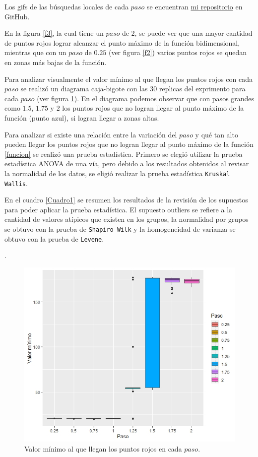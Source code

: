 \documentclass{article}
\begin{document}
Los gifs \citep{4} de las búsquedas locales de cada $paso$ se encuentran \href{https://github.com/nataliaperez0/Simulation/tree/main/Tarea7}{mi repositorio} en GitHub.
\bigskip

En la figura \ref{f3}, la cual tiene un $paso$ de $2$, se puede ver que una mayor cantidad de puntos rojos lograr alcanzar el punto máximo de la función bidimensional, mientras que con un $paso$ de $0.25$ (ver figura \ref{f2}) varios puntos rojos se quedan en zonas más bajas de la función.
\bigskip

Para analizar visualmente el valor mínimo al que llegan los puntos rojos con cada $paso$ se realizó un diagrama caja-bigote con las $30$ replicas del exprimento para cada $paso$ (ver figura \ref{f4}). En el diagrama podemos observar que con pasos grandes como $1.5$, $1.75$ y $2$ los puntos rojos que no logran llegar al punto máximo de la función (punto azul), si logran llegar a zonas altas.
\bigskip

Para analizar si existe una relación entre la variación del $paso$ y qué tan alto pueden llegar los puntos rojos que no logran llegar al punto máximo de la función \eqref{funcion} se realizó una prueba estadística. Primero se elegió utilizar la prueba estadística ANOVA de una vía, pero debido a los resultados obtenidos al revisar la normalidad de los datos, se eligió realizar la prueba estadística \texttt{Kruskal Wallis}.
\bigskip

En el cuadro \ref{Cuadro1} se  resumen los resultados de la revisión de los supuestos para poder aplicar la prueba estadística. El supuesto outliers se refiere a la cantidad de valores atípicos que existen en los grupos, la normalidad por grupos se obtuvo con la prueba de \texttt{Shapiro Wilk} y la homogeneidad de varianza se obtuvo con la prueba de \texttt{Levene}.

\newpage
.
\bigskip

\begin{figure} [h!]%
    \centering
    \includegraphics[width=150mm]{Figura12.jpeg} %
    \caption{Valor mínimo al que llegan los puntos rojos en cada $paso$.}
    \label{f4}
\end{figure}
\end{document}
